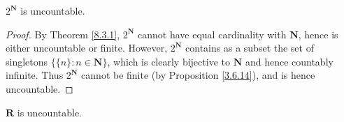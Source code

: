 \begin{corollary}\label{8.3.3}
    \(2^{\mathbf{N}}\) is uncountable.
\end{corollary}

\begin{proof}
    By Theorem \ref{8.3.1}, \(2^{\mathbf{N}}\) cannot have equal cardinality with \(\mathbf{N}\), hence is either uncountable or finite.
    However, \(2^{\mathbf{N}}\) contains as a subset the set of singletons \(\{\{n\} : n \in \mathbf{N}\}\), which is clearly bijective to \(\mathbf{N}\) and hence countably infinite.
    Thus \(2^{\mathbf{N}}\) cannot be finite (by Proposition \ref{3.6.14}), and is hence uncountable.
\end{proof}

\begin{corollary}\label{8.3.4}
    \(\mathbf{R}\) is uncountable.
\end{corollary}

